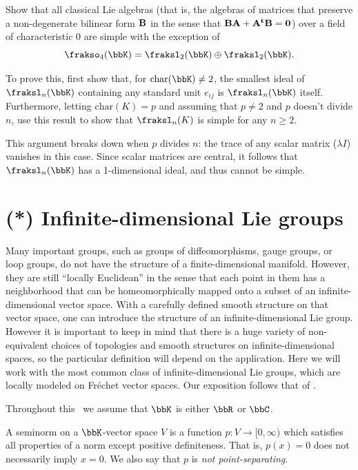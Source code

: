 \begin{xca}
    Show that all classical Lie algebras (that is, the algebras of matrices that preserve a non-degenerate bilinear form $\bf{B}$ in the sense that $\bf{B}A+A^t\bf{B}=0$) over a field of characteristic 0 are simple with the exception of
    \[\frakso_4(\bbK)=\fraksl_2(\bbK)\oplus\fraksl_2(\bbK).\]

    To prove this, first show that, for $\mathrm{char}(\bbK)\neq 2$, the smallest ideal of $\fraksl_n(\bbK)$ containing any standard unit $e_{ij}$ is $\fraksl_n(\bbK)$ itself. Furthermore, letting $\mathrm{char}(K)=p$ and assuming that $p\neq 2$ and $p$ doesn't divide $n$, use this result to show that $\fraksl_n(K)$ is simple for any $n\geq 2$. 

    This argument breaks down when $p$ divides $n$: the trace of any scalar matrix ($\lambda I$) vanishes in this case. Since scalar matrices are central, it follows that $\fraksl_n(\bbK)$ has a 1-dimensional ideal, and thus cannot be simple.
\end{xca}






\section{(*) Infinite-dimensional Lie groups}\label{sec: inf-dim groups}


Many important groups, such as groups of diffeomorphisms, gauge groups, or loop groups, do not have the structure of a finite-dimensional manifold. However, they are still ``locally Euclidean'' in the sense that each point in them has a neighborhood that can be homeomorphically mapped onto a subset of an infinite-dimensional vector space. With a carefully defined smooth structure on that vector space, one can introduce the structure of an infinite-dimensional Lie group. However it is important to keep in mind that there is a huge variety of non-equivalent choices of topologies and smooth structures on infinite-dimensional spaces, so the particular definition will depend on the application. Here we will work with the most common class of infinite-dimensional Lie groups, which are locally modeled on Fr\'echet vector spaces. Our exposition follows that of \cite{Neeb}.

Throughout this \sect\  we assume that $\bbK$ is either $\bbR$ or $\bbC$.

\begin{defn}[Seminorm]
    A seminorm on a $\bbK$-vector space $V$ is a function $p:V\to [0,\infty)$ which satisfies all properties of a norm except positive definiteness. That is, $p(x)=0$ does not necessarily imply $x=0$. We also say that $p$ is \emph{not point-separating}.
\end{defn}

